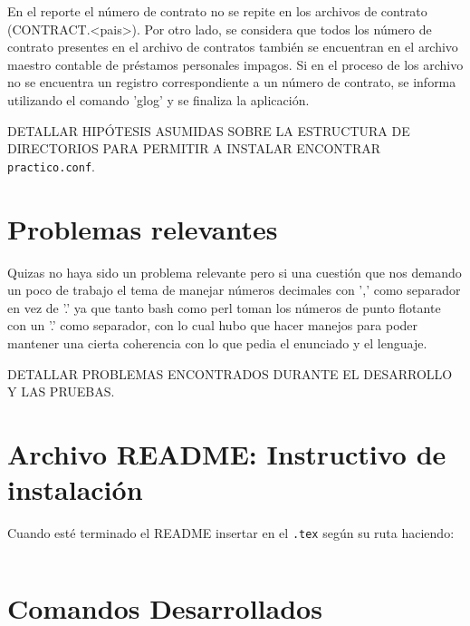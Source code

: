 \documentclass[12pt]{article}
\begin{document}
En el reporte el número de contrato no se repite en los archivos de contrato (CONTRACT.<pais>). Por otro lado, se considera que todos los número de contrato presentes en el archivo de contratos también se encuentran en el archivo maestro contable de préstamos personales impagos. Si en el proceso de los archivo no se encuentra un registro correspondiente a un número de contrato, se informa utilizando el comando 'glog' y se finaliza la aplicación. 


DETALLAR HIPÓTESIS ASUMIDAS SOBRE LA ESTRUCTURA DE DIRECTORIOS PARA PERMITIR A INSTALAR ENCONTRAR \verb|practico.conf|.

\section{Problemas relevantes}

Quizas no haya sido un problema relevante pero si una cuestión que nos demando un poco de trabajo el tema de manejar números decimales con ',' como separador en vez de '.' ya que tanto bash como perl toman los números de punto flotante con un '.' como separador, con lo cual hubo que hacer manejos para poder mantener una cierta coherencia con lo que pedia el enunciado y el lenguaje.

DETALLAR PROBLEMAS ENCONTRADOS DURANTE EL DESARROLLO Y LAS PRUEBAS.



\section{Archivo README: Instructivo de instalación}
Cuando esté terminado el README insertar en el \verb|.tex| según su ruta haciendo:
\begin{verbatim}

\end{verbatim}

\section{Comandos Desarrollados}
\end{document}
